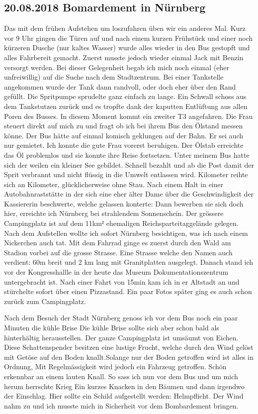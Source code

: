 \subsection{20.08.2018 Bomardement in Nürnberg}
Das mit dem frühen Aufstehen um loszufahren üben wir ein anderes Mal.
Kurz vor 9 Uhr gingen die Türen auf und nach einem kurzen Frühstück und einer noch kürzeren Dusche (nur kaltes Wasser) wurde alles wieder in den Bus gestopft und alles Fahrbereit gemacht.
Zuerst musste jedoch wieder einmal Jack mit Benzin versorgt werden.
Bei dieser Gelegenheit begab ich mich noch einmal (eher unfreiwillig) auf die Suche nach dem Stadtzentrum.
Bei einer Tankstelle angekommen wurde der Tank dann randvoll, oder doch eher über den Rand gefüllt.
Die Spritpumpe sprudelte ganz einfach zu lange.
Ein Schwall schoss aus dem Tankstutzen zurück und es tropfte dank der kaputten Entlüftung aus allen Poren des Busses.
In diesem Moment kommt ein zweiter T3 angefahren.
Die Frau steuert direkt auf mich zu und fragt ob ich bei ihrem Bus den Ölstand messen könne.
Der Bus hätte auf einmal komisch geklungen auf der Bahn.
Er sei auch nur gemietet.
Ich konnte die gute Frau vorerst beruhigen.
Der Ölstab erreichte das Öl problemlos und sie konnte ihre Reise fortsetzen.
Unter meinem Bus hatte sich der weilen ein kleiner See gebildet.
Schnell bezahlt und ab die Post damit der Sprit verbrannt und nicht flüssig in die Umwelt entlassen wird.
Kilometer reihte sich an Kilometer, glücklicherweise ohne Stau.
Nach einem Halt in einer Autobahnraststätte in der sich eine eher älter Dame über die Geschwindigkeit der Kassiererin beschwerte, welche gelassen konterte: Dann bewerben sie sich doch hier, erreichte ich Nürnberg bei strahlendem Sonnenschein.
Der grössere Campingplatz ist auf dem 11km$²$ ehemaligen Reichsparteitaggelände gelegen.
Nach dem Aufstellen wollte ich sofort Nürnberg besichtigen, was ich nach einem Nickerchen auch tat.
Mit dem Fahrrad ginge es zuerst durch  den Wald am Stadion vorbei auf die grosse Strasse.
Eine Strasse welche den Namen auch verdient: 60m breit und 2 km lang mit Granitplatten ausgelegt.
Danach stand ich vor der Kongresshallle in der heute das Museum \qlqq Dokumentationszentrum\rqq{} untergebracht ist. 
Nach einer Fahrt von 15min kam ich in er Altstadt an und stürchelte sofort über einen Pizzastand.
Ein paar Fotos später ging es auch schon zurück zum Campingplatz.

Nach dem Besuch der Stadt Nürnberg genoss ich vor dem Bus noch ein paar Minuten die kühle Brise
Die kühle Brise sollte sich aber schon bald als hinterhältig herausstellen.
Der ganze Campingplatz ist umsäumt von Eichen.
Diese Schattenspender besitzen eine lustige Frucht, welche durch den Wind gelöst mit Getöse auf den Boden knallt.Solange nur der Boden getroffen wird ist alles in Ordnung,
Mit Regelmässigkeit wird jedoch ein Fahrzeug getroffen.
Schön erkennbar an einem lauten Knall.
So sass ich nun vor dem Bus und um mich herum herrschte Krieg
Ein kurzes Knacken in den Bäumen und dann irgendwo der Einschlag.
Hier sollte ein Schild aufgestellt werden: Helmpflicht.
Der Wind nahm zu und ich musste mich in Sicherheit vor dem Bombardement bringen.

